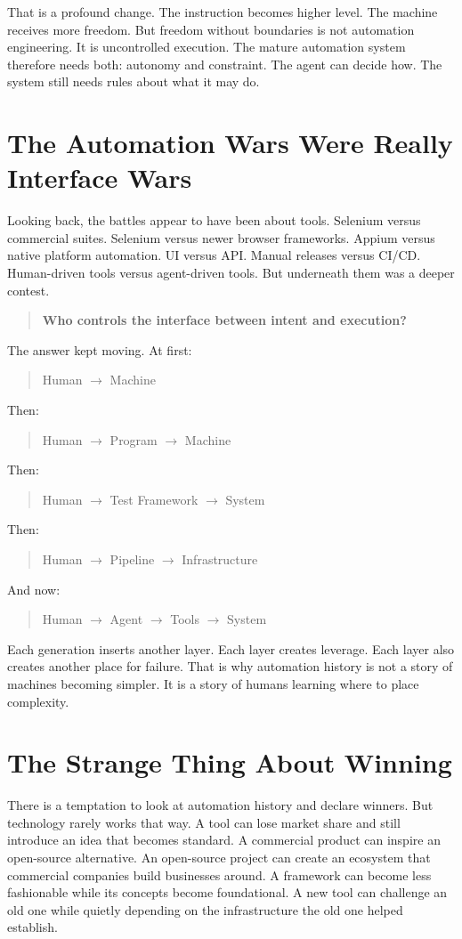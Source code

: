 \documentclass[11pt,twoside]{book}
\begin{document}
That is a profound change.
The instruction becomes higher level.
The machine receives more freedom.
But freedom without boundaries is not automation engineering.
It is uncontrolled execution.
The mature automation system therefore needs both:
autonomy and constraint.
The agent can decide how.
The system still needs rules about what it may do.

\section*{The Automation Wars Were Really Interface Wars}

Looking back, the battles appear to have been about tools.
Selenium versus commercial suites.
Selenium versus newer browser frameworks.
Appium versus native platform automation.
UI versus API.
Manual releases versus CI/CD.
Human-driven tools versus agent-driven tools.
But underneath them was a deeper contest.
\begin{quote}
\textbf{Who controls the interface between intent and execution?}
\end{quote}
The answer kept moving.
At first:
\begin{quote}
Human $\rightarrow$ Machine
\end{quote}
Then:
\begin{quote}
Human $\rightarrow$ Program $\rightarrow$ Machine
\end{quote}
Then:
\begin{quote}
Human $\rightarrow$ Test Framework $\rightarrow$ System
\end{quote}
Then:
\begin{quote}
Human $\rightarrow$ Pipeline $\rightarrow$ Infrastructure
\end{quote}
And now:
\begin{quote}
Human $\rightarrow$ Agent $\rightarrow$ Tools $\rightarrow$ System
\end{quote}

Each generation inserts another layer.
Each layer creates leverage.
Each layer also creates another place for failure.
That is why automation history is not a story of machines becoming simpler.
It is a story of humans learning where to place complexity.

\section*{The Strange Thing About Winning}

There is a temptation to look at automation history and declare winners.
But technology rarely works that way.
A tool can lose market share and still introduce an idea that becomes standard.
A commercial product can inspire an open-source alternative.
An open-source project can create an ecosystem that commercial companies build businesses around.
A framework can become less fashionable while its concepts become foundational.
A new tool can challenge an old one while quietly depending on the infrastructure the old one helped establish.
\end{document}
